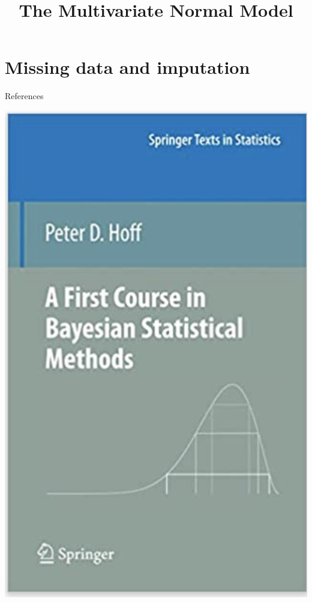 \documentclass[10pt]{beamer}
\title{The Multivariate Normal Model}
\begin{document}
\maketitle


\section{Missing data and imputation}

\begin{frame}{References}

\begin{center}
\includegraphics[width=.5\textwidth]{images/hoff_book}
\end{center}

\end{frame}
\end{document}

